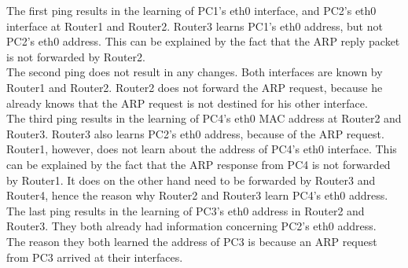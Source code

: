 The first ping results in the learning of PC1's eth0 interface, and PC2's eth0 interface at Router1 and Router2. Router3 learns PC1's eth0 address, but not PC2's eth0 address. This can be explained by the fact that the ARP reply packet is not forwarded by Router2. \\

The second ping does not result in any changes. Both interfaces are known by Router1 and Router2. Router2 does not forward the ARP request, because he already knows that the ARP request is not destined for his other interface. \\

The third ping results in the learning of PC4's eth0 MAC address at Router2 and Router3. Router3 also learns PC2's eth0 address, because of the ARP request. Router1, however, does not learn about the address of PC4's eth0 interface. This can be explained by the fact that the ARP response from PC4 is not forwarded by Router1. It does on the other hand need to be forwarded by Router3 and Router4, hence the reason why Router2 and Router3 learn PC4's eth0 address. \\

The last ping results in the learning of PC3's eth0 address in Router2 and Router3. They both already had information concerning PC2's eth0 address. \\
The reason they both learned the address of PC3 is because an ARP request from PC3 arrived at their interfaces. \\

